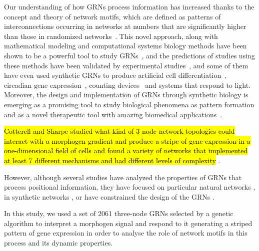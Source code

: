 \documentclass[10pt,letterpaper]{article}
\newcommand{\hil}[1]{\hl{#1}} %
\begin{document}
Our understanding of how GRNs process information has increased thanks to the
concept and theory of network motifs, which are defined as patterns of
interconnections occurring in networks at numbers that are significantly higher
than those in randomized networks~\cite{Milo2002}. This novel approach, along
with mathematical modeling and computational systems biology methods have been
shown to be a powerful tool to study GRNs~\cite{kitano_computational_2002}, and
the predictions of studies using these methods have been validated by
experimental studies~\cite{Kalir2005,Kalir2004,Mangan2003a,ODonnell2005}, and
some of them have even used synthetic GRNs to produce artificial cell
differentiation~\cite{Basu2005}, circadian gene
expression~\cite{atkinson_development_2003}, counting
devices~\cite{friedland_synthetic_2009} and systems that respond to light.
Moreover, the design and implementation of GRNs through synthetic biology is
emerging as a promising tool to study biological phenomena as pattern formation
\cite{santos-moreno_using_2019} and as a novel therapeutic tool with amazing
biomedical applications~\cite{karlsson_therapeutic_2012,
higashikuni_advancing_2017,abil_synthetic_2015,healy_genetic_2019,
kitada_programming_2018}.

\hil{Cotterell and Sharpe studied what kind of 3-node network topologies could
interact with a morphogen gradient and produce a stripe of gene expression
in a one-dimensional field of cells and found a variety of networks that
implemented at least 7 different mechanisms and had different levels of
complexity} \cite{Cotterell2010}.

However, although several studies have analyzed the properties of GRNs that
process positional information, they have focused on particular natural networks
\cite{Schaerli2014,Jaeger2004}, in synthetic networks
\cite{Basu2005,Reinitz1995,Schaerli2018}, or have constrained the design of the
GRNs \cite{Elowitz2000}.

In this study, we used a set of 2061 three-node GRNs selected by a genetic
algorithm to interpret a morphogen signal and respond to it generating a
striped pattern of gene expression in order to analyse the role of network
motifs in this process and its dynamic properties.

\end{document}
